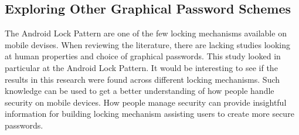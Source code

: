     \subsection{Exploring Other Graphical Password Schemes}
      The Android Lock Pattern are one of the few locking mechanisms available on mobile devises. When reviewing the literature, there are lacking studies looking at human properties and choice of graphical passwords. This study looked in particular at the Android Lock Pattern. It would be interesting to see if the results in this research were found across different locking mechanisms. Such knowledge can be used to get a better understanding of how people handle security on mobile devices. How people manage security can provide insightful information for building locking mechanism assisting users to create more secure passwords.
    